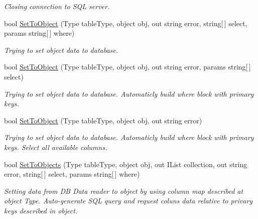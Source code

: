\begin{DoxyCompactItemize}
\begin{DoxyCompactList}\small\item\em Closing connection to S\+QL server. \end{DoxyCompactList}\item 
bool \mbox{\hyperlink{class_uniform_data_operator_1_1_sql_1_1_my_sql_1_1_my_sql_data_operator_a8f44635dc337c3652041f079190a792d}{Set\+To\+Object}} (Type table\+Type, object obj, out string error, string\mbox{[}$\,$\mbox{]} select, params string\mbox{[}$\,$\mbox{]} where)
\begin{DoxyCompactList}\small\item\em Trying to set object data to database. \end{DoxyCompactList}\item 
bool \mbox{\hyperlink{class_uniform_data_operator_1_1_sql_1_1_my_sql_1_1_my_sql_data_operator_af763205fa1d8a8ad83afc672d5743d65}{Set\+To\+Object}} (Type table\+Type, object obj, out string error, params string\mbox{[}$\,$\mbox{]} select)
\begin{DoxyCompactList}\small\item\em Trying to set object data to database. Automaticly build where block with primary keys. \end{DoxyCompactList}\item 
bool \mbox{\hyperlink{class_uniform_data_operator_1_1_sql_1_1_my_sql_1_1_my_sql_data_operator_a5da5cc531c8c953f73e7fc50513790e9}{Set\+To\+Object}} (Type table\+Type, object obj, out string error)
\begin{DoxyCompactList}\small\item\em Trying to set object data to database. Automaticly build where block with primary keys. Select all available columns. \end{DoxyCompactList}\item 
bool \mbox{\hyperlink{class_uniform_data_operator_1_1_sql_1_1_my_sql_1_1_my_sql_data_operator_a38d9367d43538c2afc77331fe18ab666}{Set\+To\+Objects}} (Type table\+Type, object obj, out I\+List collection, out string error, string\mbox{[}$\,$\mbox{]} select, params string\mbox{[}$\,$\mbox{]} where)
\begin{DoxyCompactList}\small\item\em Setting data from DB Data reader to object by using column map described at object Type. Auto-\/generate S\+QL query and request coluns data relative to privary keys described in object. \end{DoxyCompactList}\item 

\end{DoxyCompactItemize}
